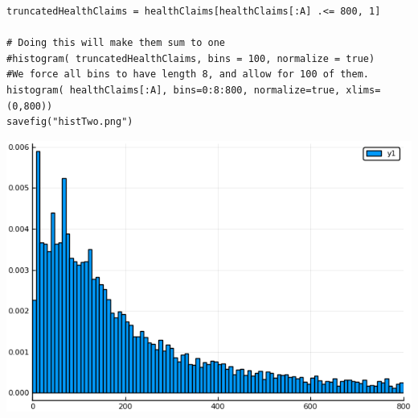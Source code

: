 \documentclass[12pt, letterpaper]{paper}
\begin{document}
\begin{verbatim}
truncatedHealthClaims = healthClaims[healthClaims[:A] .<= 800, 1]

# Doing this will make them sum to one
#histogram( truncatedHealthClaims, bins = 100, normalize = true)
#We force all bins to have length 8, and allow for 100 of them.
histogram( healthClaims[:A], bins=0:8:800, normalize=true, xlims=(0,800))
savefig("histTwo.png")

\end{verbatim}

\begin{center}
\includegraphics[width=.9\linewidth]{histTwo.png}
\end{center}
\end{document}
